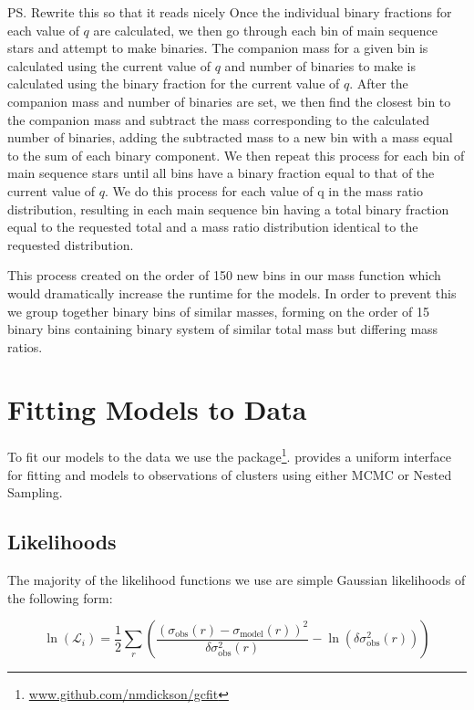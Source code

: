 \ps{Rewrite this so that it reads nicely}
Once the individual binary fractions for each value of $q$ are calculated, we then go through each
bin of main sequence stars and attempt to make binaries. The companion mass for a given bin is
calculated using the current value of $q$ and number of binaries to make is calculated using the
binary fraction for the current value of $q$. After the companion mass and number of binaries are
set, we then find the closest bin to the companion mass and subtract the mass corresponding to the
calculated number of binaries, adding the subtracted mass to a new bin with a mass equal to the sum
of each binary component. We then repeat this process for each bin of main sequence stars until all
bins have a binary fraction equal to that of the current value of $q$. We do this process for each
value of q in the mass ratio distribution, resulting in each main sequence bin having a total binary
fraction equal to the requested total and a mass ratio distribution identical to the requested
distribution.

This process created on the order of 150 new bins in our mass function which would dramatically
increase the runtime for the  models. In order to prevent this we group together binary
bins of similar masses, forming on the order of 15 binary bins containing binary system of similar
total mass but differing mass ratios.





\section{Fitting Models to Data}


To fit our models to the data we use the 
package\footnote{\url{www.github.com/nmdickson/gcfit}}.  provides a uniform interface for
fitting \evolvemf{} and  models to observations of clusters using either MCMC or Nested
Sampling.

\subsection{Likelihoods}

The majority of the likelihood functions we use are simple Gaussian likelihoods of the following form:

\begin{equation}
	\ln \left(\mathcal{L}_{i}\right)=\frac{1}{2}
	\sum_{r}\left(\frac{\left(\sigma_{\mathrm{obs}}(r)
		-\sigma_{\mathrm{model}}(r)\right)^{2}}{\delta \sigma_{\mathrm{obs}}^{2}(r)}
	-\ln \left(\delta \sigma_{\mathrm{obs}}^{2}(r)\right)\right)
\end{equation}

